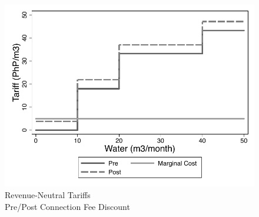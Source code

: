 \documentclass[12pt]{article}
\begin{document}
\begin{figure}
\centering
\caption{Revenue-Neutral Tariffs \\ Pre/Post Connection Fee Discount}\label{figure:discounttariff}
\includegraphics[scale=.7]{tables/discount_tariff_groups.pdf}
\end{figure}
\end{document}

